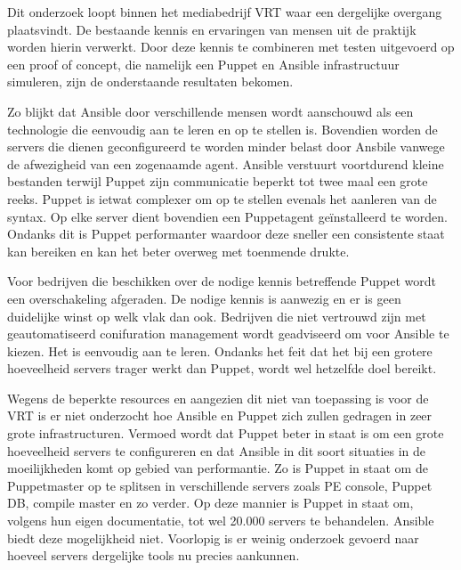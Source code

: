 Dit onderzoek loopt binnen het mediabedrijf VRT waar een dergelijke overgang plaatsvindt. De bestaande kennis en ervaringen van mensen uit de praktijk worden hierin verwerkt. Door deze kennis te combineren met testen uitgevoerd op een proof of concept, die namelijk een Puppet en Ansible infrastructuur simuleren, zijn de onderstaande resultaten bekomen.

Zo blijkt dat Ansible door verschillende mensen wordt aanschouwd als een technologie die eenvoudig aan te leren en op te stellen is. Bovendien worden de servers die dienen geconfigureerd te worden minder belast door Ansbile vanwege de afwezigheid van een zogenaamde agent. Ansible verstuurt voortdurend kleine bestanden terwijl Puppet zijn communicatie beperkt tot twee maal een grote reeks. Puppet is ietwat complexer om op te stellen evenals het aanleren van de syntax. Op elke server dient bovendien een Puppetagent ge\"installeerd te worden. Ondanks dit is Puppet performanter waardoor deze sneller een consistente staat kan bereiken en kan het beter overweg met toenmende drukte.

Voor bedrijven die beschikken over de nodige kennis betreffende Puppet wordt een overschakeling afgeraden. De nodige kennis is aanwezig en er is geen duidelijke winst op welk vlak dan ook. Bedrijven die niet vertrouwd zijn met geautomatiseerd conifuration management wordt geadviseerd om voor Ansible te kiezen. Het is eenvoudig aan te leren. Ondanks het feit dat het bij een grotere hoeveelheid servers trager werkt dan Puppet, wordt wel hetzelfde doel bereikt.


Wegens de beperkte resources en aangezien dit niet van toepassing is voor de VRT is er niet onderzocht hoe Ansible en Puppet zich zullen gedragen in zeer grote infrastructuren. Vermoed wordt dat Puppet beter in staat is om een grote hoeveelheid servers te configureren en dat Ansible in dit soort situaties in de moeilijkheden komt op gebied van performantie. Zo is Puppet in staat om de Puppetmaster op te splitsen in verschillende servers zoals PE console, Puppet DB, compile master en zo verder. Op deze mannier is Puppet in staat om, volgens hun eigen documentatie, tot wel 20.000 servers te behandelen. Ansible biedt deze mogelijkheid niet. Voorlopig is er weinig onderzoek gevoerd naar hoeveel servers dergelijke tools nu precies aankunnen. 